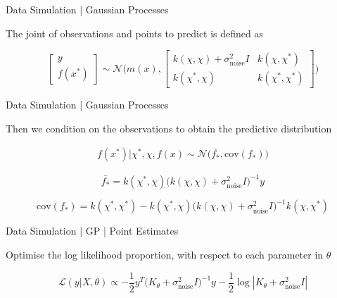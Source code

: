 \documentclass{beamer}
\begin{document}
    \begin{frame}{Data Simulation | Gaussian Processes}
    
    The joint of observations and points to predict is defined as
    
        \begin{equation}
            \begin{bmatrix}
            y \\
            f(x^\ast)
            \end{bmatrix}
            \sim
            \mathcal{N} \Bigg(m(x),
                \begin{bmatrix}
                k(\chi, \chi) + \sigma_{\text{noise}}^2I & k(\chi, \chi^\ast) \\
                k(\chi^\ast, \chi) & k(\chi^\ast, \chi^\ast)
                \end{bmatrix}
            \Bigg)
        \end{equation}
    \end{frame}
    
    \begin{frame}{Data Simulation | Gaussian Processes}
    
    Then we condition on the observations to obtain the predictive distribution
    
    \begin{equation}
        \label{eq:gp_fitted}
        \begin{split}
             f(x^\ast) | \chi^\ast, \chi, f(x) \sim \mathcal{N} \big(
            \bar{f_\ast}, \text{cov}(f_\ast)
            \big)
        \end{split}
        \end{equation}
        
        \begin{equation}
            \label{eq:gp_fitted_mean}
            \bar{f_\ast} = k(\chi^\ast, \chi) \big(k(\chi, \chi) + \sigma_{\text{noise}}^2I\big)^{-1}y
        \end{equation}
        
        \begin{equation}
            \label{eq:gp_fitted_covariance}
            \text{cov}(f_\ast) = k(\chi^\ast, \chi^\ast) - k(\chi^\ast, \chi) \big( k(\chi, \chi) + \sigma_{\text{noise}}^2I \big)^{-1} k(\chi, \chi^\ast)
        \end{equation}
    \end{frame}
    
    \begin{frame}{Data Simulation | GP | Point Estimates}
    
    Optimise the log likelihood proportion, with respect to each parameter in $\theta$
    
    \begin{equation}
        \mathcal{L}(y | X, \theta) \propto - \frac{1}{2}y^T \big(K_\theta + \sigma_{\text{noise}}^2I\big)^{-1}y - \frac{1}{2} \log{|K_\theta + \sigma_{\text{noise}}^2I|}
    \end{equation}
    \end{frame}
    
\end{document}
